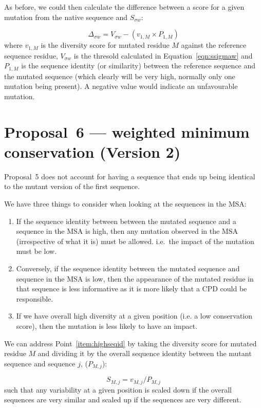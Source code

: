 \documentclass[a4paper]{article}
\begin{document}
As before, we could then calculate the difference between a score for
a given mutation from the native sequence and $S_{\sigma w}$:

\begin{equation}
  \Delta_{\sigma w} = V_{\sigma w} - (v_{1, M} \times P_{1, M})
\end{equation}
where $v_{1,M}$ is the diversity score for mutated residue $M$ against
the reference sequence residue, $V_{\sigma w}$ is the thresold
calculated in Equation~\ref{eqn:ssigmaw} and $P_{1,M}$ is the sequence
identity (or similarity) between the reference sequence and the
mutated sequence (which clearly will be very high, normally only one
mutation being present). A negative value would indicate an
unfavourable mutation.


\section{Proposal~6 --- weighted minimum conservation (Version 2)}
Proposal~5 does not account for having a sequence that ends up being
identical to the mutant version of the first sequence.

We have three things to consider when looking at the sequences in the MSA:
\begin{enumerate}
  \item \label{item:highseqid} If the sequence identity between
    between the mutated sequence and a sequence in the MSA is high,
    then any mutation observed in the MSA (irrespective of what it is)
    must be allowed.  i.e.\ the impact of the mutation must be low.
  \item \label{item:lowseqid} Conversely, if the sequence identity between the
    mutated sequence and sequence in the MSA is low, then the
    appearance of the mutated residue in that sequence is less
    informative as it is more likely that a CPD could be responsible.
  \item If we have overall high diversity at a given position (i.e. a
    low conservation score), then the mutation is less likely to have
    an impact.
\end{enumerate}

We can address Point~\ref{item:highseqid}  by
taking the diversity score for mutated residue $M$ and dividing it by
the overall sequence identity between the mutant sequence and sequence
$j$, ($P_{M, j}$):

\begin{equation}
  S_{M,j} = v_{M, j} / P_{M, j}
\end{equation}
such that any variability at a given position is scaled down if the
overall sequences are very similar and scaled up if the sequences are
very different.
\end{document}
